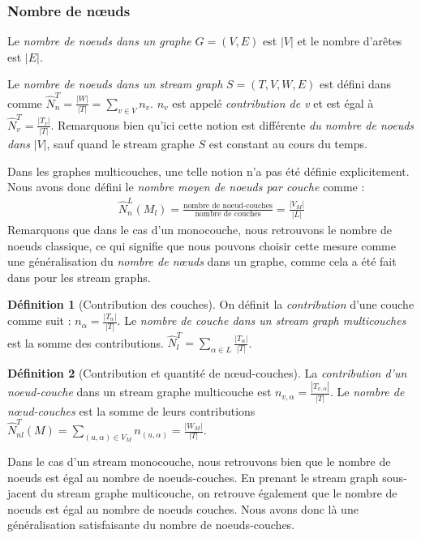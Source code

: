 \documentclass[11pt,a4paper]{article}
\theoremstyle{definition}
\newtheorem{defn}{Définition}
\theoremstyle{remark}
\theoremstyle{remark}
\begin{document}
	\subsubsection{Nombre de nœuds}
	Le {\em nombre de noeuds dans un graphe} $G=(V,E)$ est $|V|$ et le nombre d'arêtes est $|E|$.
	
	Le {\em nombre de noeuds dans un stream graph} $S=(T,V,W,E)$ est défini dans \cite{stream} comme $\hat{N}^T_n=\frac{|W|}{|T|}=\sum_{v\in V} n_v$. $n_v$ est appelé {\em contribution de v} et est égal à $\hat{N}^T_v=\frac{|T_v|}{|T|}$. Remarquons bien qu'ici cette notion est différente {\em du nombre de noeuds dans} $|V|$, sauf quand le stream graphe $S$ est constant au cours du temps.
	\newline
	
	Dans les graphes multicouches, une telle notion n'a pas été définie explicitement.
	Nous avons donc défini le {\em nombre moyen de noeuds par couche} comme :
	\begin{align*}
		\hat{N}_n^L(M_l) = \frac{\text{nombre de noeud-couches}}{\text{nombre de couches}}=\frac{|V_M|}{|L|}
	\end{align*}	    
	Remarquons que dans le cas d'un monocouche, nous retrouvons le nombre de noeuds classique, ce qui signifie que nous pouvons choisir cette mesure comme une généralisation du {\em nombre de nœuds} dans un graphe, comme cela a été fait dans \cite{stream} pour les stream graphs.
		
	
	\begin{defn}[Contribution des couches]
	On définit la {\em contribution} d'une couche comme suit : $n_\alpha = \frac{|T_{\alpha}|}{|T|}$. Le {\em nombre de couche dans un stream graph multicouches} est la somme des contributions. $\hat{N}^T_l = \sum_{\alpha \in L}\frac{ |T_{\alpha}|}{|T|}$.
    \end{defn}
	
	\begin{defn}[Contribution et quantité de nœud-couches]
	La {\em contribution d'un noeud-couche} dans un stream graphe multicouche est $n_{v,\alpha} = \frac{|T_{v,\alpha}|}{|T|}$. Le {\em nombre de nœud-couches} est la somme de leurs contributions $\hat{N}^{T}_{nl}(M) = \underset{(u,\alpha)\in V_M}{\sum} n_{(u,\alpha)} = \frac{|W_M|}{|T|}$.
    \end{defn}
	
	Dans le cas d'un stream monocouche, nous retrouvons bien que le nombre de noeuds est égal au nombre de noeuds-couches. En prenant le stream graph sous-jacent du stream graphe multicouche, on retrouve également que le nombre de noeuds est égal au nombre de noeuds couches. Nous avons donc là une généralisation satisfaisante du nombre de noeuds-couches.
    
\end{document}
